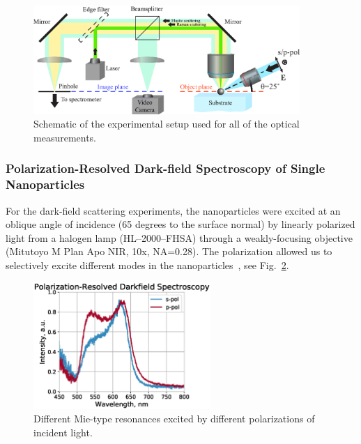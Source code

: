             \begin{figure}[!ht]
                    \begin{center}
                        \includegraphics[width=0.9\textwidth]{figs/methods/expSetup2.eps}
                    \end{center}
                    \caption{Schematic of the experimental setup used for all of the optical measurements.}
                    \label{fig:expSetup}
            \end{figure}

        \subsubsection{Polarization-Resolved Dark-field Spectroscopy of Single Nanoparticles}
            \label{sec:Darkfield}
                For the dark-field scattering experiments, the nanoparticles were excited at an oblique angle of incidence
            (65 degrees to the surface normal) by linearly polarized light from a halogen lamp (HL--2000--FHSA)
            through a weakly-focusing objective (Mitutoyo M Plan Apo NIR, 10x, NA=0.28). The polarization allowed us to
            selectively excite different modes in the nanoparticles~\cite{permyakov2015probing}, see Fig.~\ref{fig:PolarizedDF}.

            \begin{figure}[!ht]
                    \begin{center}
                        \includegraphics[width=0.6\textwidth]{figs/methods/DF/id_52780.eps}
                    \end{center}
                    \caption{Different Mie-type resonances excited by different polarizations of incident light.}
                    \label{fig:PolarizedDF}
            \end{figure}

